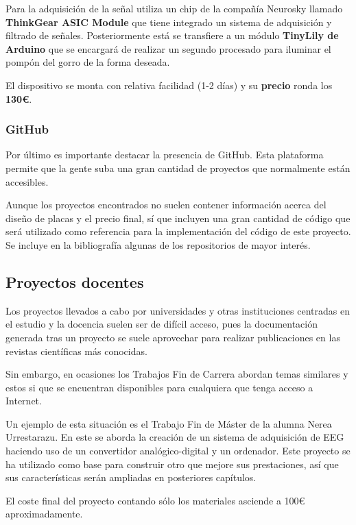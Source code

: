 Para la adquisición de la señal utiliza un chip de la compañía Neurosky llamado \textbf{ThinkGear ASIC Module} que tiene integrado un sistema de adquisición y filtrado de señales. Posteriormente está se transfiere a un módulo \textbf{TinyLily de Arduino} que se encargará de realizar un segundo procesado para iluminar el pompón del gorro de la forma deseada.

El dispositivo se monta con relativa facilidad (1-2 días) y su \textbf{precio} ronda los \textbf{130€}.

\subsubsection{GitHub}

Por último es importante destacar la presencia de GitHub. Esta plataforma permite que la gente suba una gran cantidad de proyectos que normalmente están accesibles.

Aunque los proyectos encontrados no suelen contener información acerca del diseño de placas y el precio final, sí que incluyen una gran cantidad de código que será utilizado como referencia para la implementación del código de este proyecto. Se incluye en la bibliografía algunas de los repositorios de mayor interés.

\subsection{Proyectos docentes\label{sec:Pro_docentes}}

Los proyectos llevados a cabo por universidades y otras instituciones centradas en el estudio y la docencia suelen ser de difícil acceso, pues la documentación generada tras un proyecto se suele aprovechar para realizar publicaciones en las revistas científicas más conocidas.

Sin embargo, en ocasiones los Trabajos Fin de Carrera abordan temas similares y estos si que se encuentran disponibles para cualquiera que tenga acceso a Internet. 

Un ejemplo de esta situación es el Trabajo Fin de Máster de la alumna Nerea Urrestarazu. En este se aborda la creación de un sistema de adquisición de \acrshort{EEG} haciendo uso de un convertidor analógico-digital y un ordenador. Este proyecto se ha utilizado como base para construir otro que mejore sus prestaciones, así que sus características serán ampliadas en posteriores capítulos.

El coste final del proyecto contando sólo los materiales asciende a 100€ aproximadamente.

